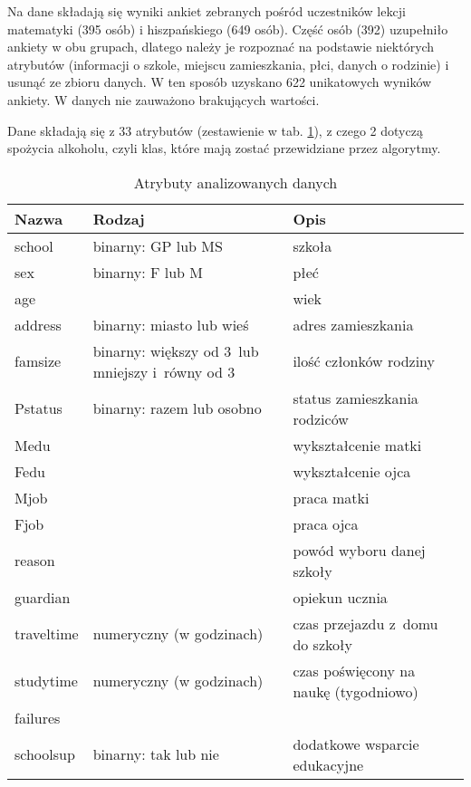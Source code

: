 Na dane składają się wyniki ankiet zebranych pośród uczestników lekcji matematyki (395 osób) i hiszpańskiego (649 osób). Część osób (392) uzupełniło ankiety w obu grupach, dlatego należy je rozpoznać na podstawie niektórych atrybutów (informacji o szkole, miejscu zamieszkania, płci, danych o rodzinie) i usunąć ze zbioru danych. W ten sposób uzyskano 622 unikatowych wyników ankiety. W danych nie zauważono brakujących wartości.

Dane składają się z 33 atrybutów (zestawienie w tab. \ref{tab:attributes}), z czego 2 dotyczą spożycia alkoholu, czyli klas, które mają zostać przewidziane przez algorytmy. 
\begin{table}[h]
\centering
\caption{Atrybuty analizowanych danych}
\label{tab:attributes}
\begin{tabular}{|p{1.4cm}|p{3cm}|p{3cm}|}
\hline
Nazwa & Rodzaj & Opis \\ \hline
school   &     binarny: GP lub MS &   szkoła \\ \hline
sex   &   binarny: F lub M   &   płeć \\ \hline
age   &      &  wiek  \\ \hline
address   &   binarny: miasto lub wieś   &  adres zamieszkania  \\ \hline
famsize   &  binarny: większy od 3\ lub mniejszy i~równy od 3     &  ilość członków rodziny  \\ \hline
Pstatus   &  binarny: razem lub osobno    &  status zamieszkania rodziców  \\ \hline
Medu   &      &   wykształcenie matki \\ \hline
Fedu   &      &  wykształcenie ojca  \\ \hline
Mjob   &      &  praca matki  \\ \hline
Fjob   &      &  praca ojca  \\ \hline
reason   &      &   powód wyboru danej szkoły \\ \hline
guardian   &      &  opiekun ucznia  \\ \hline
traveltime   &   numeryczny (w godzinach)    &   czas przejazdu z~domu do szkoły    \\ \hline
studytime   &   numeryczny (w godzinach)   &  czas poświęcony na naukę (tygodniowo)  \\ \hline
failures   &      &    \\ \hline
schoolsup   &  binarny: tak lub nie  & dodatkowe wsparcie edukacyjne   \\ \hline

\end{tabular}
\end{table}
